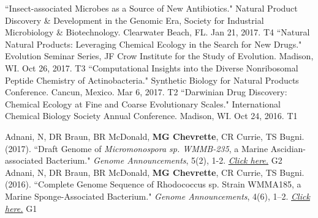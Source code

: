 
\begin{cvpubs}
  \cvpub
    {``Insect-associated Microbes as a Source of New Antibiotics." Natural Product Discovery \& Development in the Genomic Era, Society for Industrial Microbiology \& Biotechnology. Clearwater Beach, FL. Jan 21, 2017.} %
    {T4} %
  \cvpub
    {``Natural Natural Products: Leveraging Chemical Ecology in the Search for New Drugs." Evolution Seminar Series, JF Crow Institute for the Study of Evolution. Madison, WI. Oct 26, 2017.} %
    {T3} %
  \cvpub
    {``Computational Insights into the Diverse Nonribosomal Peptide Chemistry of Actinobacteria." Synthetic Biology for Natural Products Conference. Cancun, Mexico. Mar 6, 2017.} %
    {T2} %
  \cvpub
    {``Darwinian Drug Discovery: Chemical Ecology at Fine and Coarse Evolutionary Scales." International Chemical Biology Society Annual Conference. Madison, WI. Oct 24, 2016.} %
    {T1} %
\end{cvpubs}


\begin{cvpubs}
  \cvpub
    {Adnani, N, DR Braun, BR McDonald, \textbf{MG Chevrette}, CR Currie, TS Bugni. (2017). ``Draft Genome of \textit{Micromonospora sp. WMMB-235}, a Marine Ascidian-associated Bacterium." \textit{Genome Announcements}, 5(2), 1-2. \textit{\href{https://doi.org/10.1128/genomeA.01369-16}{Click here.}} } %
    {G2} %
  \cvpub
  {Adnani, N, DR Braun, BR McDonald, \textbf{MG Chevrette}, CR Currie, TS Bugni. (2016). ``Complete Genome Sequence of Rhodococcus sp. Strain WMMA185, a Marine Sponge-Associated Bacterium." \textit{Genome Announcements}, 4(6), 1–2. \textit{\href{https://doi.org/10.1128/genomeA.01406-16}{Click here.}}} %
    {G1} %
\end{cvpubs}


